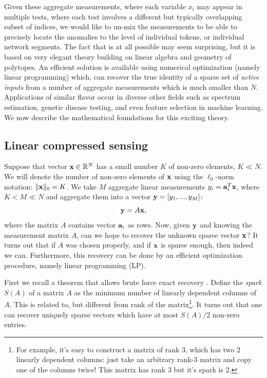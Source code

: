 Given these aggregate measurements, where each variable $x_i$ may appear in multiple tests, 
where each test involves a different but typically overlapping subset of indices, we would like 
to un-mix the 
measurements to be able to precisely locate the anomalies to the level of individual tokens, 
or individual network segments.  The fact that is at all possible may seem surprising, but it 
is based on very elegant theory building on linear algebra and geometry of polytopes.  An 
efficient solution is available using numerical optimization (namely linear programming) which, 
can recover the true identity of a sparse set of {\em active inputs} from a number of aggregate 
measurements which is much smaller than $N$. Applications of similar flavor occur in 
diverse other fields such as spectrum estimation, genetic disease testing, and even feature 
selection in machine learning. We now describe the mathematical foundations for this exciting 
theory. 

\subsection{ Linear compressed sensing}

Suppose that  vector $\mathbf{x} \in \mathbb{R}^N$ has a small number $K$ of non-zero elements, $K \ll N$. 
We will denote the number of non-zero elements of $\mathbf{x}$ using the $\ell_0$-norm notation: 
$\Vert \mathbf{x} \Vert_0 = K$.   We take $M$ aggregate linear measurements $y_i = \mathbf{a}_i^T \mathbf{x}$, where 
$K < M \ll N$ and aggregate them into a vector $\mathbf{y} = [y_1, ..., y_M]$:
\begin{equation}
\mathbf{y} = A \mathbf{x},
\end{equation}
where the matrix $A$ contains vector $\mathbf{a}_i$ as rows. Now, given $\mathbf{y}$ and knowing the 
measurement matrix $A$, can we hope to recover the unknown 
sparse vector $\mathbf{x}$?  It turns out that if $A$ was chosen properly, and if $\mathbf{x}$ is sparse 
enough, then indeed we can. Furthermore, this recovery can be done by an efficient optimization
procedure, namely linear programming (LP). 

First we recall a theorem that allows brute force exact recovery \cite{Donoho}. Define the {\em spark} 
$S(A)$ of a matrix $A$ as the minimum number of linearly dependent columns of $A$. This is related to, 
but different from rank of the matrix\footnote{For example, it's easy to construct a matrix of rank 
$3$, which has two $2$ linearly dependent columns: just take an arbitrary rank-$3$ matrix and 
copy one of the columns twice! This matrix has rank $3$ but it's spark is $2$. }. It turns out that 
one can recover uniquely sparse vectors which have at most $S(A) / 2$ non-zero entries. 
 
